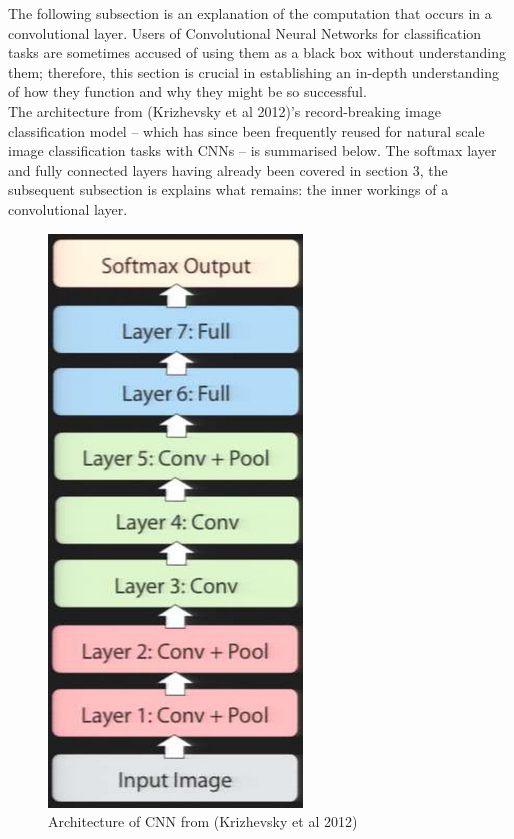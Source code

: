\documentclass[a4paper,11pt]{article}
\begin{document}
The following subsection is an explanation of the computation that occurs in a convolutional layer. Users of Convolutional Neural Networks for classification tasks are sometimes accused of using them as a black box without understanding them; therefore, this section is crucial in establishing an in-depth understanding of how they function and why they might be so successful. \\

The architecture from (Krizhevsky et al 2012)'s record-breaking image classification model -- which has since been frequently reused for natural scale image classification tasks with CNNs \cite{rectifier} \cite{goodfellow_street_view} \cite{decaf} \cite{fergus_tutorial} \cite{colah} \cite{zeiler_fergus} \cite{transfer-learning} \cite{caffe-website}  -- is summarised below. The softmax layer and fully connected layers having already been covered in section 3, the subsequent subsection is explains what remains: the inner workings of a convolutional layer. \\

\begin{figure}[h!]
	\centering
	\includegraphics[scale=0.3]{images/alexnet_architecture_simple.png}
	\caption{Architecture of CNN from (Krizhevsky et al 2012)}
\end{figure}
\end{document}
